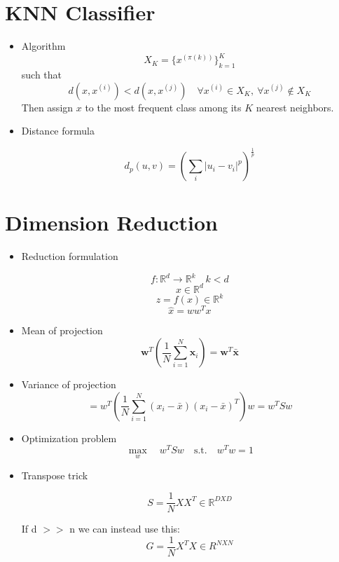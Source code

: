 \documentclass[11pt]{article}
\begin{document}
\section{KNN Classifier}
\begin{itemize}
	\item Algorithm
	      \[
		      X_K = \{ x^{(\pi(k))} \}_{k=1}^K
	      \]
	      such that
	      \[
		      d(x, x^{(i)}) < d(x, x^{(j)}) \quad \forall x^{(i)} \in X_K, \ \forall x^{(j)} \notin X_K
	      \]
	      Then assign $x$ to the most frequent class among its $K$ nearest neighbors.
	\item Distance formula

	      \[
		      d_p(u, v) = \left( \sum_i |u_i - v_i|^p \right)^{\tfrac{1}{p}}
	      \]
\end{itemize}

\section{Dimension Reduction}
\begin{itemize}
	\subsection{PCA}
	\item Reduction formulation

	      \[
		      f: \mathbb{R}^d \rightarrow \mathbb{R}^k \quad k<d
	      \]
	      \[
		      x \in \mathbb{R}^d
	      \]
	      \[
		      z = f(x) \in \mathbb{R}^k
	      \]
	      \[
		      \hat{x} = w w^T x
	      \]
	\item Mean of projection
	      \[
		      \mathbf{w}^T \left( \frac{1}{N} \sum_{i=1}^{N} \mathbf{x}_i \right)
		      = \mathbf{w}^T \bar{\mathbf{x}}
	      \]
	\item Variance of projection
	      \[
		      = w^T \left( \frac{1}{N} \sum_{i=1}^{N} (x_i - \bar{x})(x_i - \bar{x})^T \right) w
		      = w^T S w
	      \]
	\item Optimization problem
	      \[
		      \max_{w} \quad w^T S w \quad \text{s.t.} \quad w^T w = 1
	      \]
	\item Transpose trick

	      \[
		      S = \frac{1}{N}XX^T \in \mathbb{R}^{DXD}
	      \]

	      If d $>>$ n we can instead use this:
	      \[
		      G = \frac{1}{N}X^TX \in R^{NXN}
	      \]
\end{itemize}
\end{document}
